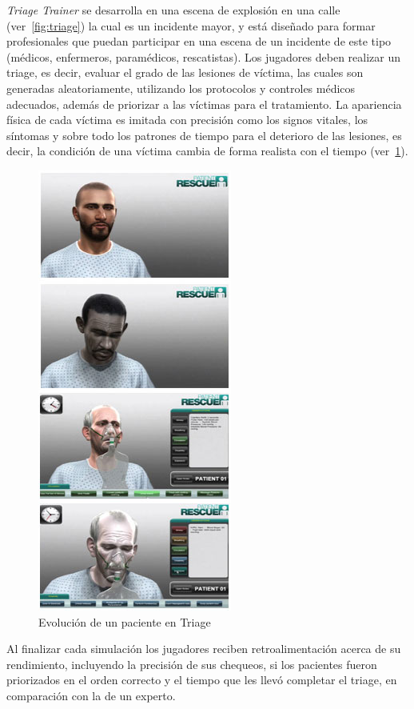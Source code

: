 \emph{Triage Trainer} se desarrolla en una escena de explosión en una calle
(ver~\ref{fig:triage}) la cual es un incidente mayor, y está diseñado para
formar profesionales que puedan participar en una escena de un incidente de este
tipo (médicos, enfermeros, paramédicos, rescatistas). Los jugadores deben
realizar un triage, es decir, evaluar el grado de las lesiones de víctima, las
cuales son generadas aleatoriamente, utilizando los protocolos y controles
médicos adecuados, además de priorizar a las víctimas para el tratamiento. La
apariencia física de cada víctima es imitada con precisión como los signos
vitales, los síntomas y sobre todo los patrones de tiempo para el deterioro de
las lesiones, es decir, la condición de una víctima cambia de forma realista con
el tiempo (ver~\ref{fig:triage_patient1}).

\begin{figure}[ht!]
\centering 
\includegraphics[scale=0.5]{tics/images/patient_side.jpg}
\caption{Evolución de un paciente en Triage}
\label{fig:triage_patient1}
\end{figure}

Al finalizar cada simulación los jugadores reciben retroalimentación acerca de
su rendimiento, incluyendo la precisión de sus chequeos, si los pacientes fueron
priorizados en el orden correcto y el tiempo que les llevó completar el triage,
en comparación con la de un experto.

